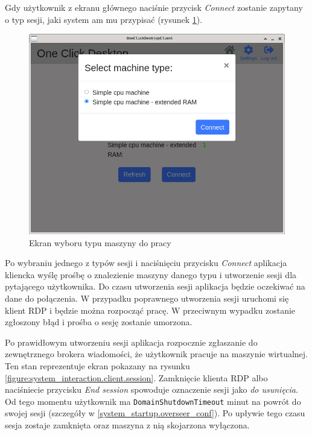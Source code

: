 \documentclass[../opis-rozwiazania.tex]{subfiles}
\begin{document}
Gdy użytkownik z ekranu głównego naciśnie przycisk \textit{Connect} zostanie zapytany o typ sesji, jaki system am mu przypisać (rysunek \ref{figure:system_interaction.client.select}).

\begin{figure}[H]
	\centering
	\includegraphics[width=\textwidth]{resources/client_select.png}
	\caption{Ekran wyboru typu maszyny do pracy}
	\label{figure:system_interaction.client.select}
\end{figure}

Po wybraniu jednego z typów sesji i naciśnięciu przycisku \textit{Connect} aplikacja kliencka wyślę prośbę o znalezienie maszyny danego typu i utworzenie sesji dla pytającego użytkownika.
Do czasu utworzenia sesji aplikacja będzie oczekiwać na dane do połączenia.
W przypadku poprawnego utworzenia sesji uruchomi się klient RDP i będzie można rozpocząć pracę.
W przeciwnym wypadku zostanie zgłoszony błąd i prośba o sesję zostanie umorzona.

Po prawidłowym utworzeniu sesji aplikacja rozpocznie zgłaszanie do zewnętrznego brokera wiadomości, że użytkownik pracuje na maszynie wirtualnej.
Ten stan reprezentuje ekran pokazany na rysunku \ref{figure:system_interaction.client.session}.
Zamknięcie klienta RDP albo naciśniecie przycisku \textit{End session} spowoduje oznaczenie sesji jako \textit{do usunięcia}.
Od tego momentu użytkownik ma \texttt{DomainShutdownTimeout} minut na powrót do swojej sesji (szczegóły w \ref{system_startup.overseer_conf}).
Po upływie tego czasu sesja zostaje zamknięta oraz maszyna z nią skojarzona wyłączona.
\end{document}
